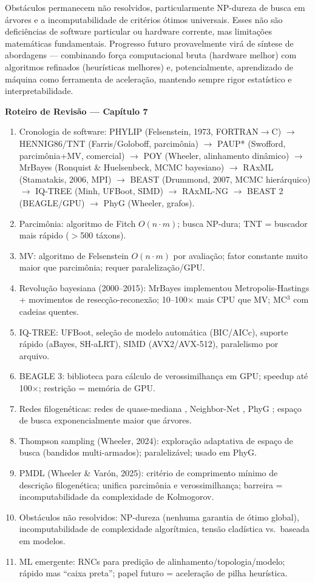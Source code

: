 Obstáculos permanecem não resolvidos, particularmente NP-dureza de busca em árvores e a incomputabilidade de critérios ótimos universais. Esses não são deficiências de software particular ou hardware corrente, mas limitações matemáticas fundamentais. Progresso futuro provavelmente virá de síntese de abordagens --- combinando força computacional bruta (hardware melhor) com algoritmos refinados (heurísticas melhores) e, potencialmente, aprendizado de máquina como ferramenta de aceleração, mantendo sempre rigor estatístico e interpretabilidade.

\clearpage
\begin{destaque}
\textbf{Roteiro de Revisão --- Capítulo 7}
\begin{enumerate}\small
    \item Cronologia de software: PHYLIP (Felsenstein, 1973, FORTRAN$\to$C) $\to$ HENNIG86/TNT (Farris/Goloboff, parcimônia) $\to$ PAUP* (Swofford, parcimônia+MV, comercial) $\to$ POY (Wheeler, alinhamento dinâmico) $\to$ MrBayes (Ronquist \& Huelsenbeck, MCMC bayesiano) $\to$ RAxML (Stamatakis, 2006, MPI) $\to$ BEAST (Drummond, 2007, MCMC hierárquico) $\to$ IQ-TREE (Minh, UFBoot, SIMD) $\to$ RAxML-NG $\to$ BEAST 2 (BEAGLE/GPU) $\to$ PhyG (Wheeler, grafos).
    \item Parcimônia: algoritmo de Fitch $O(n\cdot m)$; busca NP-dura; TNT = buscador mais rápido ($>$500 táxons).
    \item MV: algoritmo de Felsenstein $O(n\cdot m)$ por avaliação; fator constante muito maior que parcimônia; requer paralelização/GPU.
    \item Revolução bayesiana (2000--2015): MrBayes implementou Metropolis-Hastings + movimentos de resecção-reconexão; 10--100$\times$ mais CPU que MV; MC$^3$ com cadeias quentes.
    \item IQ-TREE: UFBoot, seleção de modelo automática (BIC/AICc), suporte rápido (aBayes, SH-aLRT), SIMD (AVX2/AVX-512), paralelismo por arquivo.
    \item BEAGLE 3: biblioteca para cálculo de verossimilhança em GPU; speedup até 100$\times$; restrição = memória de GPU.
    \item Redes filogenéticas: redes de quase-mediana \parencite{holland2004}, Neighbor-Net \parencite{bryant2004}, PhyG \parencite{wheeler2024a}; espaço de busca exponencialmente maior que árvores.
    \item Thompson sampling (Wheeler, 2024): exploração adaptativa de espaço de busca (bandidos multi-armados); paralelizável; usado em PhyG.
    \item PMDL (Wheeler \& Varón, 2025): critério de comprimento mínimo de descrição filogenética; unifica parcimônia e verossimilhança; barreira = incomputabilidade da complexidade de Kolmogorov.
    \item Obstáculos não resolvidos: NP-dureza (nenhuma garantia de ótimo global), incomputabilidade de complexidade algorítmica, tensão cladística vs.\ baseada em modelos.
    \item ML emergente: RNCs para predição de alinhamento/topologia/modelo; rápido mas ``caixa preta''; papel futuro = aceleração de pilha heurística.
\end{enumerate}
\end{destaque}

\clearpage

\printbibliography[heading=subbibliography,title={Referências}]

